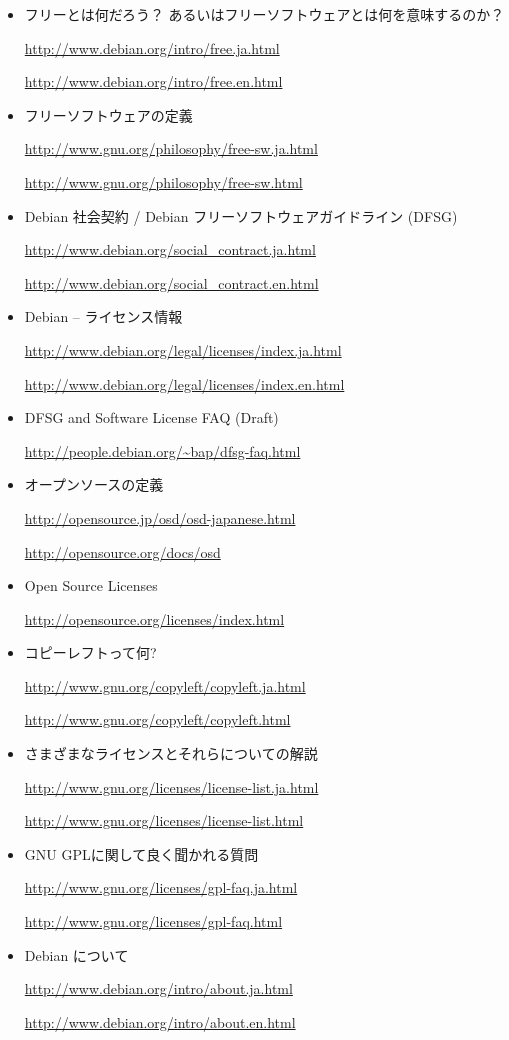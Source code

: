\documentclass[mingoth,a4paper]{jsarticle}
\begin{document}
\begin{itemize}
 \item フリーとは何だろう？ あるいはフリーソフトウェアとは何を意味するのか？

\url{http://www.debian.org/intro/free.ja.html}

\url{http://www.debian.org/intro/free.en.html}

 \item フリーソフトウェアの定義

\url{http://www.gnu.org/philosophy/free-sw.ja.html}

\url{http://www.gnu.org/philosophy/free-sw.html}

 \item Debian 社会契約 / Debian フリーソフトウェアガイドライン (DFSG)

\url{http://www.debian.org/social_contract.ja.html}

\url{http://www.debian.org/social_contract.en.html}

 \item Debian -- ライセンス情報

\url{http://www.debian.org/legal/licenses/index.ja.html}

\url{http://www.debian.org/legal/licenses/index.en.html}

 \item DFSG and Software License FAQ (Draft)

\url{http://people.debian.org/~bap/dfsg-faq.html}

 \item オープンソースの定義

\url{http://opensource.jp/osd/osd-japanese.html}

\url{http://opensource.org/docs/osd}

 \item Open Source Licenses

\url{http://opensource.org/licenses/index.html}

 \item コピーレフトって何?

\url{http://www.gnu.org/copyleft/copyleft.ja.html}

\url{http://www.gnu.org/copyleft/copyleft.html}

 \item さまざまなライセンスとそれらについての解説

\url{http://www.gnu.org/licenses/license-list.ja.html}

\url{http://www.gnu.org/licenses/license-list.html}

 \item GNU GPLに関して良く聞かれる質問

\url{http://www.gnu.org/licenses/gpl-faq.ja.html}

\url{http://www.gnu.org/licenses/gpl-faq.html}

 \item Debian について

\url{http://www.debian.org/intro/about.ja.html}

\url{http://www.debian.org/intro/about.en.html}

\end{itemize}
\end{document}
